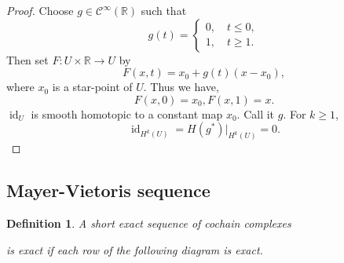 \documentclass[10pt]{article}
\newtheorem{definition}{Definition}[section]
\DeclareMathOperator{\id}{id}
\newcommand{\R}[0]{\mathbb{R}}
\newcommand{\cinf}[0]{\mathcal{C}^\infty}
\begin{document}
\begin{proof}
  Choose $g\in\cinf(\R)$ such that 
  \begin{equation*}
    g(t) = \begin{cases}
      0,\quad t\leq 0,\\
      1,\quad t\geq 1.
    \end{cases}
  \end{equation*}
  Then set $F:U\times\R\to U$ by 
  \begin{equation*}
    F(x,t) = x_0+g(t)(x-x_0),
  \end{equation*}
  where $x_0$ is a star-point of $U$. Thus we have,
  \begin{equation*}
    F(x,0) = x_0,F(x,1) = x.
  \end{equation*}
  $\id_U$ is smooth homotopic to a constant map $x_0$. Call it $g$. For $k\geq1$,
  \begin{equation*}
    \id_{H^k(U)} = H(g^*)|_{H^k(U)} = 0.
  \end{equation*}
\end{proof}

\subsection{Mayer-Vietoris sequence}

\begin{definition}
  A short exact sequence of cochain complexes
   \begin{center}
  \end{center}
  is exact if each row of the following diagram is exact.
  \begin{center}
  \end{center}
\end{definition}
\end{document}
